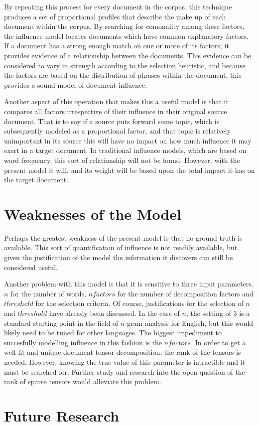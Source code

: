 \documentclass[../ut-dissertation.tex]{subfiles}
\begin{document}
By repeating this process for every document in the corpus, this
technique produces a set of proportional profiles that describe the
make up of each document within the corpus.  By searching for
comonality among these factors, the influence model locates documents
which have common explanatory factors.  If a document has a strong
enough match on one or more of its factors, it provides evidence of a
relationship between the documents.  This evidence can be considered
to vary in strength according to the selection heuristic, and because
the factors are based on the distribution of phrases within the
document, this provides a sound model of document influence.

Another aspect of this operation that makes this a useful model is
that it compares all factors irrespective of their influence in their
original source document.  That is to say if a source puts forward
some topic, which is subsequently modeled as a proportional factor,
and that topic is relatively unimportant in its source this will have
no impact on how much influence it may exert in a target document.  In
traditional influence models, which are based on word frequency, this
sort of relationship will not be found.  However, with the present
model it will, and its weight will be based upon the total impact it
has on the target document. 

\section{Weaknesses of the Model}
Perhaps the greatest weakness of the present model is that no ground
truth is available.  This sort of quantification of influence is not
readily available, but given the justification of the model the
information it discovers can still be considered useful.

Another problem with this model is that it is sensitive to three input
parameters.  $n$ for the number of words, $nfactors$ for the number of
decomposition factors and $threshold$ for the selection criteria.  Of
course, justifications for the selection of $n$ and $threshold$ have
already been discussed.  In the case of $n$, the setting of 3 is a
standard starting point in the field of $n$-gram analysis for English,
but this would likely need to be tuned for other languages.  The
biggest impediment to succesfully modelling influence in this fashion
is the $nfactors$.  In order to get a well-fit and unique document
tensor decomposition, the rank of the tensors is needed.  However,
knowing the true value of this parameter is intractible and it must be
searched for.  Further study and research into the open question of
the rank of sparse tensors would alleviate this problem.


\section{Future Research}
\end{document}
